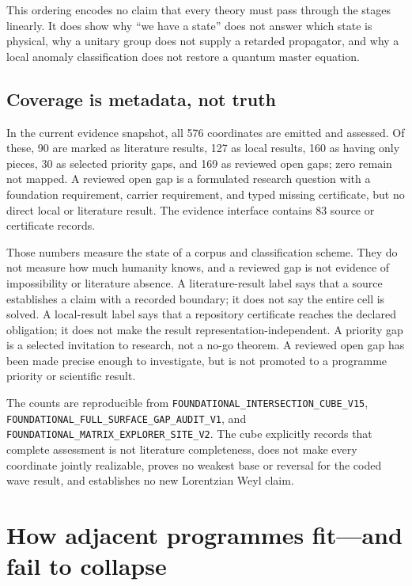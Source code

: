 \documentclass[11pt]{article}
\theoremstyle{definition}
\theoremstyle{remark}
\newcommand{\cert}[1]{\nolinkurl{#1}}
\begin{document}
This ordering encodes no claim that every theory must pass through the stages
linearly.  It does show why ``we have a state'' does not answer which state is
physical, why a unitary group does not supply a retarded propagator, and why a
local anomaly classification does not restore a quantum master equation.

\subsection{Coverage is metadata, not truth}

In the current evidence snapshot, all 576 coordinates are emitted and assessed.
Of these, 90 are marked as literature results, 127 as local results, 160 as
having only pieces, 30 as selected priority gaps, and 169 as reviewed open
gaps; zero remain not mapped.  A reviewed open gap is a formulated research
question with a foundation requirement, carrier requirement, and typed missing
certificate, but no direct local or literature result.  The evidence interface
contains 83 source or certificate records.

Those numbers measure the state of a corpus and classification scheme.  They
do not measure how much humanity knows, and a reviewed gap is not evidence of
impossibility or literature absence.  A literature-result label says that a source establishes a
claim with a recorded boundary; it does not say the entire cell is solved.  A
local-result label says that a repository certificate reaches the declared
obligation; it does not make the result representation-independent.  A
priority gap is a selected invitation to research, not a no-go theorem.  A
reviewed open gap has been made precise enough to investigate, but is not
promoted to a programme priority or scientific result.

The counts are reproducible from
\cert{FOUNDATIONAL_INTERSECTION_CUBE_V15},
\cert{FOUNDATIONAL_FULL_SURFACE_GAP_AUDIT_V1}, and
\cert{FOUNDATIONAL_MATRIX_EXPLORER_SITE_V2}.  The cube explicitly records that
complete assessment is not literature completeness, does not make every
coordinate jointly realizable, proves no weakest base or reversal for the
coded wave result, and establishes no new Lorentzian Weyl claim.

\section{How adjacent programmes fit---and fail to collapse}
\label{sec:literature}
\end{document}
